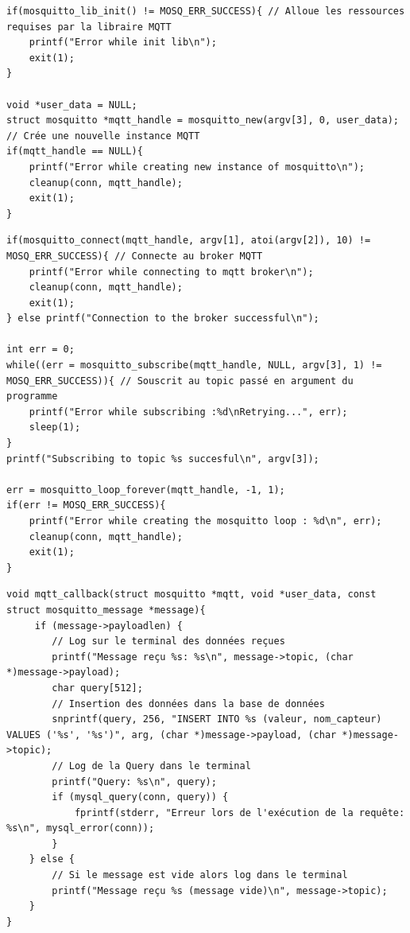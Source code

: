 \documentclass[a4paper,11pt]{article}
\begin{document}
        \begin{lstlisting}[style=C, caption={Allocation des ressources MQTT et création de l'instance}]
if(mosquitto_lib_init() != MOSQ_ERR_SUCCESS){ // Alloue les ressources requises par la libraire MQTT
    printf("Error while init lib\n");
    exit(1);
} 

void *user_data = NULL;
struct mosquitto *mqtt_handle = mosquitto_new(argv[3], 0, user_data); // Crée une nouvelle instance MQTT
if(mqtt_handle == NULL){
    printf("Error while creating new instance of mosquitto\n");
    cleanup(conn, mqtt_handle);
    exit(1);
} 
        \end{lstlisting}

        \newpage
        \begin{lstlisting}[style=C, caption={Connexion au broker et souscription au topic}]
if(mosquitto_connect(mqtt_handle, argv[1], atoi(argv[2]), 10) != MOSQ_ERR_SUCCESS){ // Connecte au broker MQTT
    printf("Error while connecting to mqtt broker\n");
    cleanup(conn, mqtt_handle);
    exit(1);
} else printf("Connection to the broker successful\n");

int err = 0;
while((err = mosquitto_subscribe(mqtt_handle, NULL, argv[3], 1) != MOSQ_ERR_SUCCESS)){ // Souscrit au topic passé en argument du programme
    printf("Error while subscribing :%d\nRetrying...", err);
    sleep(1);
}
printf("Subscribing to topic %s succesful\n", argv[3]);

err = mosquitto_loop_forever(mqtt_handle, -1, 1);
if(err != MOSQ_ERR_SUCCESS){
    printf("Error while creating the mosquitto loop : %d\n", err);
    cleanup(conn, mqtt_handle);
    exit(1);
}
        \end{lstlisting}

        \begin{lstlisting}[style=C, caption={MQTT Callback}]
void mqtt_callback(struct mosquitto *mqtt, void *user_data, const struct mosquitto_message *message){
     if (message->payloadlen) {
        // Log sur le terminal des données reçues
        printf("Message reçu %s: %s\n", message->topic, (char *)message->payload);
        char query[512];
        // Insertion des données dans la base de données
        snprintf(query, 256, "INSERT INTO %s (valeur, nom_capteur) VALUES ('%s', '%s')", arg, (char *)message->payload, (char *)message->topic);
        // Log de la Query dans le terminal
        printf("Query: %s\n", query);
        if (mysql_query(conn, query)) {
            fprintf(stderr, "Erreur lors de l'exécution de la requête: %s\n", mysql_error(conn));
        }
    } else {
        // Si le message est vide alors log dans le terminal
        printf("Message reçu %s (message vide)\n", message->topic);
    }
}
        \end{lstlisting}
\end{document}
